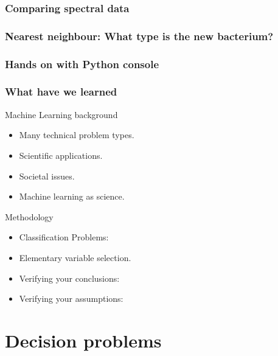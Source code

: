 \begin{frame}
\frametitle{Comparing spectral data}
\end{frame}
\begin{frame}
  \frametitle{Nearest neighbour: What type is the new bacterium?}
  
\end{frame}

\begin{frame}
  \frametitle{Hands on with Python console}
  

\end{frame}

\begin{frame}
  \frametitle{What have we learned}
  \begin{block}{Machine Learning background}
    \begin{itemize}
    \item Many \alert{technical} problem types.
    \item \alert{Scientific} applications.
    \item \alert{Societal} issues.
    \item Machine learning as science.
    \end{itemize}
  \end{block}

  \begin{block}{Methodology}
    \begin{itemize}
    \item \alert{Classification} Problems: 
    \item Elementary \alert{variable selection}.
    \item \alert{Verifying} your \alert{conclusions}: 
    \item Verifying your \alert{assumptions}: 
    \end{itemize}
  \end{block}
\end{frame}

\section{Decision problems}

